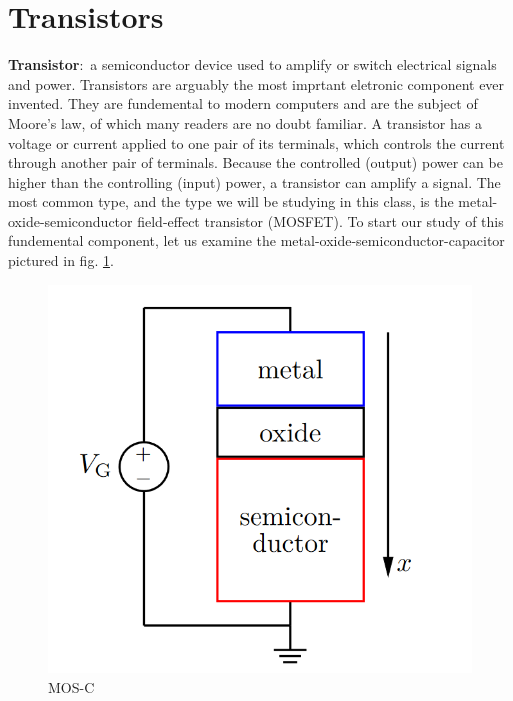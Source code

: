 \documentclass[nobib]{tufte-handout}
\newcommand{\defn}[2]{\noindent\textbf{#1}:\ #2}
\begin{document}
\section{Transistors}
\defn{Transistor}{a semiconductor device used to amplify or switch 
electrical signals and power}. Transistors are arguably the most imprtant 
eletronic component ever invented. They are fundemental to modern computers 
and are the subject of Moore's law, of which many readers are no doubt familiar. 
A transistor has a voltage or current applied to one pair of its terminals, 
which controls the current through another pair of terminals. 
Because the controlled (output) power can be higher than the controlling 
(input) power, a transistor can amplify a signal. The most common type, 
and the type we will be studying in this class, is the metal-oxide-semiconductor 
field-effect transistor (MOSFET). To start our study of this fundemental component, 
let us examine the metal-oxide-semiconductor-capacitor pictured in fig. \ref{fig:MOSC}. 
\begin{figure}
    \caption{MOS-C}
    \label{fig:MOSC}
    \begin{center}
        \includegraphics{images/MOSC.png}
    \end{center}
\end{figure}
\end{document}
